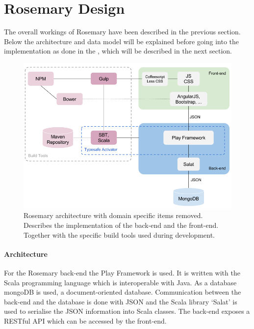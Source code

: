 \section{Rosemary Design}
\label{reuse-rosemary}

The overall workings of Rosemary have been described in the previous section.
Below the architecture and data model will be explained before going into the implementation as done in the \ivfsystem{}, which will be described in the next section.

\begin{figure}[!hb]
	\centering
	\includegraphics[width=1.0\linewidth]{images/rosemary-architecture}
	\caption{
		Rosemary architecture with domain specific items removed.
		Describes the implementation of the back-end and the front-end.
		Together with the specific build tools used during development.
	}
	\label{fig:reuse-rosemary-architecture}
\end{figure}

\paragraph{Architecture}
For the Rosemary back-end the Play Framework \cite{play} is used.
It is written with the Scala \cite{scala} programming language which is interoperable with Java.
As a database mongoDB \cite{mongo} is used, a document-oriented database.
Communication between the back-end and the database is done with JSON \cite{json} and the Scala library `Salat' is used to serialise the JSON information into Scala classes.
The back-end exposes a RESTful API which can be accessed by the front-end.

